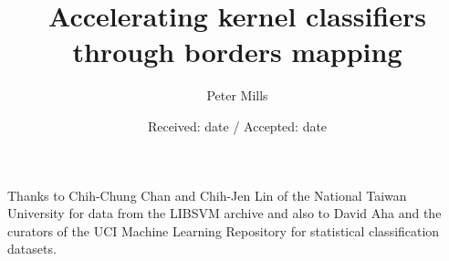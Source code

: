 \title{Accelerating kernel classifiers through borders mapping}


\author{Peter Mills}



\date{Received: date / Accepted: date}


\maketitle

\begin{abstract}
	
\end{abstract}



\appendix



\begin{acknowledgements}
Thanks to Chih-Chung Chan and Chih-Jen Lin of the National Taiwan University
for data from the LIBSVM archive and also to David Aha and the curators of
the UCI Machine Learning Repository for statistical classification datasets.
\end{acknowledgements}


%



